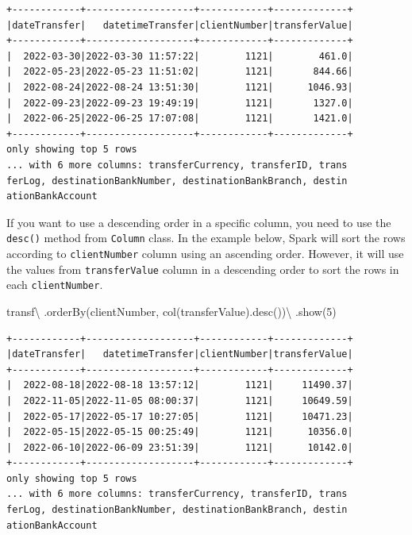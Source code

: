 \documentclass[
  11pt,
  letterpaper,
  DIV=11,
  numbers=noendperiod]{scrreprt}
\newenvironment{Shaded}{\begin{snugshade}}{\end{snugshade}}
\newcommand{\DecValTok}[1]{\textcolor[rgb]{0.68,0.00,0.00}{#1}}
\newcommand{\NormalTok}[1]{\textcolor[rgb]{0.00,0.23,0.31}{#1}}
\newcommand{\OperatorTok}[1]{\textcolor[rgb]{0.37,0.37,0.37}{#1}}
\newcommand{\StringTok}[1]{\textcolor[rgb]{0.13,0.47,0.30}{#1}}
\begin{document}
\begin{verbatim}
+------------+-------------------+------------+-------------+
|dateTransfer|   datetimeTransfer|clientNumber|transferValue|
+------------+-------------------+------------+-------------+
|  2022-03-30|2022-03-30 11:57:22|        1121|        461.0|
|  2022-05-23|2022-05-23 11:51:02|        1121|       844.66|
|  2022-08-24|2022-08-24 13:51:30|        1121|      1046.93|
|  2022-09-23|2022-09-23 19:49:19|        1121|       1327.0|
|  2022-06-25|2022-06-25 17:07:08|        1121|       1421.0|
+------------+-------------------+------------+-------------+
only showing top 5 rows
... with 6 more columns: transferCurrency, transferID, trans
ferLog, destinationBankNumber, destinationBankBranch, destin
ationBankAccount
\end{verbatim}

If you want to use a descending order in a specific column, you need to
use the \texttt{desc()} method from \texttt{Column} class. In the
example below, Spark will sort the rows according to
\texttt{clientNumber} column using an ascending order. However, it will
use the values from \texttt{transferValue} column in a descending order
to sort the rows in each \texttt{clientNumber}.

\begin{Shaded}
\begin{Highlighting}[]
\NormalTok{transf}\OperatorTok{\textbackslash{}}
\NormalTok{  .orderBy(}\StringTok{\textquotesingle{}clientNumber\textquotesingle{}}\NormalTok{, col(}\StringTok{\textquotesingle{}transferValue\textquotesingle{}}\NormalTok{).desc())}\OperatorTok{\textbackslash{}}
\NormalTok{  .show(}\DecValTok{5}\NormalTok{)}
\end{Highlighting}
\end{Shaded}

\begin{verbatim}
+------------+-------------------+------------+-------------+
|dateTransfer|   datetimeTransfer|clientNumber|transferValue|
+------------+-------------------+------------+-------------+
|  2022-08-18|2022-08-18 13:57:12|        1121|     11490.37|
|  2022-11-05|2022-11-05 08:00:37|        1121|     10649.59|
|  2022-05-17|2022-05-17 10:27:05|        1121|     10471.23|
|  2022-05-15|2022-05-15 00:25:49|        1121|      10356.0|
|  2022-06-10|2022-06-09 23:51:39|        1121|      10142.0|
+------------+-------------------+------------+-------------+
only showing top 5 rows
... with 6 more columns: transferCurrency, transferID, trans
ferLog, destinationBankNumber, destinationBankBranch, destin
ationBankAccount
\end{verbatim}
\end{document}
